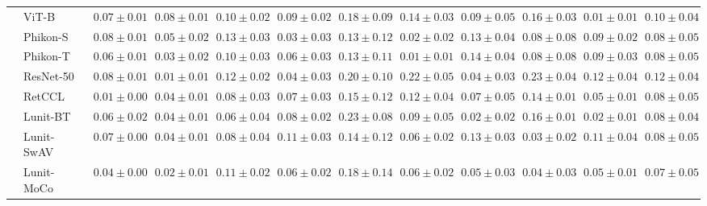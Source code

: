 \begin{tabular}{ll|cccc|c|cccc|c}
 & ViT-B~\cite{kolesnikov2021image} & $0.07 \pm 0.01$ & $0.08 \pm 0.01$ & $0.10 \pm 0.02$ & $0.09 \pm 0.02$ & $0.18 \pm 0.09$ & $0.14 \pm 0.03$ & $0.09 \pm 0.05$ & $0.16 \pm 0.03$ & $\mathbf{0.01 \pm 0.01}$ & $0.10 \pm 0.04$ \\
 & Phikon-S~\cite{filiot2023scaling} & $0.08 \pm 0.01$ & $0.05 \pm 0.02$ & $0.13 \pm 0.03$ & $0.03 \pm 0.03$ & $0.13 \pm 0.12$ & $0.02 \pm 0.02$ & $0.13 \pm 0.04$ & $0.08 \pm 0.08$ & $0.09 \pm 0.02$ & $0.08 \pm 0.05$ \\
 & Phikon-T~\cite{filiot2023scaling} & $0.06 \pm 0.01$ & $0.03 \pm 0.02$ & $0.10 \pm 0.03$ & $0.06 \pm 0.03$ & $0.13 \pm 0.11$ & $\mathbf{0.01 \pm 0.01}$ & $0.14 \pm 0.04$ & $0.08 \pm 0.08$ & $0.09 \pm 0.03$ & $0.08 \pm 0.05$ \\
 & ResNet-50~\cite{he2015deep} & $0.08 \pm 0.01$ & $\mathbf{0.01 \pm 0.01}$ & $0.12 \pm 0.02$ & $0.04 \pm 0.03$ & $0.20 \pm 0.10$ & $0.22 \pm 0.05$ & $0.04 \pm 0.03$ & $0.23 \pm 0.04$ & $0.12 \pm 0.04$ & $0.12 \pm 0.04$ \\
 & RetCCL~\cite{wang2023retccl} & $0.01 \pm 0.00$ & $0.04 \pm 0.01$ & $0.08 \pm 0.03$ & $0.07 \pm 0.03$ & $0.15 \pm 0.12$ & $0.12 \pm 0.04$ & $0.07 \pm 0.05$ & $0.14 \pm 0.01$ & $0.05 \pm 0.01$ & $0.08 \pm 0.05$ \\
 & Lunit-BT~\cite{kang2023benchmarking} & $0.06 \pm 0.02$ & $0.04 \pm 0.01$ & $0.06 \pm 0.04$ & $0.08 \pm 0.02$ & $0.23 \pm 0.08$ & $0.09 \pm 0.05$ & $0.02 \pm 0.02$ & $0.16 \pm 0.01$ & $0.02 \pm 0.01$ & $0.08 \pm 0.04$ \\
 & Lunit-SwAV~\cite{kang2023benchmarking} & $0.07 \pm 0.00$ & $0.04 \pm 0.01$ & $0.08 \pm 0.04$ & $0.11 \pm 0.03$ & $0.14 \pm 0.12$ & $0.06 \pm 0.02$ & $0.13 \pm 0.03$ & $0.03 \pm 0.02$ & $0.11 \pm 0.04$ & $0.08 \pm 0.05$ \\
 & Lunit-MoCo~\cite{kang2023benchmarking} & $0.04 \pm 0.00$ & $0.02 \pm 0.01$ & $0.11 \pm 0.02$ & $0.06 \pm 0.02$ & $0.18 \pm 0.14$ & $0.06 \pm 0.02$ & $0.05 \pm 0.03$ & $0.04 \pm 0.03$ & $0.05 \pm 0.01$ & $0.07 \pm 0.05$ \\
\cline{1-12}
\bottomrule
\end{tabular}
